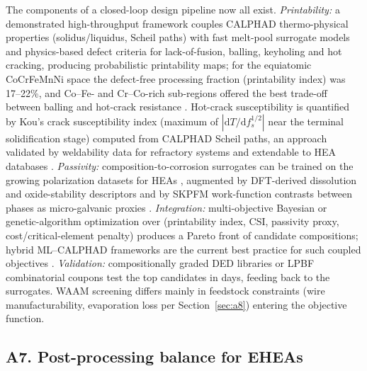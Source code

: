 The components of a closed-loop design pipeline now all exist. \emph{Printability:} a demonstrated high-throughput framework couples CALPHAD thermo-physical properties (solidus/liquidus, Scheil paths) with fast melt-pool surrogate models and physics-based defect criteria for lack-of-fusion, balling, keyholing and hot cracking, producing probabilistic printability maps; for the equiatomic CoCrFeMnNi space the defect-free processing fraction (printability index) was 17--22\%, and Co--Fe- and Cr--Co-rich sub-regions offered the best trade-off between balling and hot-crack resistance \cite{npm_printability2025}. Hot-crack susceptibility is quantified by Kou's crack susceptibility index (maximum of $|\mathrm{d}T/\mathrm{d}f_s^{1/2}|$ near the terminal solidification stage) computed from CALPHAD Scheil paths, an approach validated by weldability data for refractory systems and extendable to HEA databases \cite{lanl_csi2025}. \emph{Passivity:} composition-to-corrosion surrogates can be trained on the growing polarization datasets for HEAs \cite{qiu2017,qiu2019}, augmented by DFT-derived dissolution and oxide-stability descriptors and by SKPFM work-function contrasts between phases as micro-galvanic proxies \cite{lu2018design,quiambao2019}. \emph{Integration:} multi-objective Bayesian or genetic-algorithm optimization over (printability index, CSI, passivity proxy, cost/critical-element penalty) produces a Pareto front of candidate compositions; hybrid ML--CALPHAD frameworks are the current best practice for such coupled objectives \cite{jmatman_ml2026}. \emph{Validation:} compositionally graded DED libraries or LPBF combinatorial coupons test the top candidates in days, feeding back to the surrogates. WAAM screening differs mainly in feedstock constraints (wire manufacturability, evaporation loss per Section~\ref{sec:a8}) entering the objective function.

\subsection{A7. Post-processing balance for EHEAs}
\label{sec:a7}

